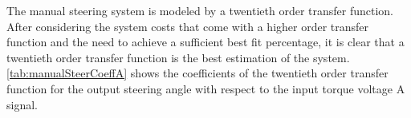 \documentclass[letterpaper,12pt]{article}   %
\begin{document}
\vspace{12pt}
\noindent The manual steering system is modeled by a twentieth order transfer
function. After considering the system costs that come with a higher order
transfer function and the need to achieve a sufficient best fit percentage, it
is clear that a twentieth order transfer function is the best estimation of the
system. \autoref{tab:manualSteerCoeffA} shows the coefficients of the twentieth
order transfer function for the output steering angle with respect to the input
torque voltage A signal. %
%
  \begin{table}[hbtp]
    \caption{Manual mode steering transfer function torque voltage A coefficient table. }
    \label{tab:manualSteerCoeffA}
    \centering
    \begin{center}
    \end{center}
  \end{table}
%
\end{document}
